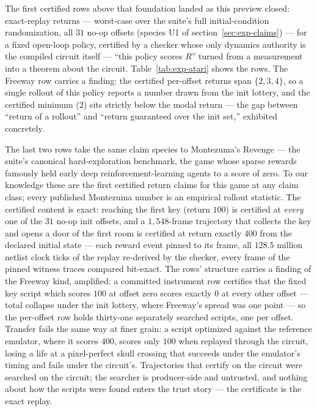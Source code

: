 The first certified rows above that foundation landed as this
preview closed: exact-replay returns --- worst-case over the suite's
full initial-condition randomization, all $31$ no-op offsets (species
U1 of section~\ref{sec:exp-claims}) --- for a fixed open-loop
policy, certified by a checker whose only dynamics
authority is the compiled circuit itself --- ``this policy scores
$R$'' turned from a measurement into a theorem about the circuit.
Table~\ref{tab:exp-atari} shows the rows. The Freeway row carries a
finding: the certified per-offset returns span $\{2,3,4\}$, so a
single rollout of this policy reports a number drawn from the init
lottery, and the certified minimum ($2$) sits strictly below the
modal return --- the gap between ``return of a rollout'' and ``return
guaranteed over the init set,'' exhibited concretely.

The last two rows take the same claim species to Montezuma's Revenge
--- the suite's canonical hard-exploration benchmark, the game whose
sparse rewards famously held early deep reinforcement-learning agents
to a score of zero. To our knowledge these are the first certified
return claims for this game at any claim class; every published
Montezuma number is an empirical rollout statistic. The certified
content is exact: reaching the first key (return $100$) is certified
at \emph{every} one of the $31$ no-op init offsets, and a
$1{,}548$-frame trajectory that collects the key and opens a door of
the first room is certified at return exactly $400$ from the declared
initial state --- each reward event pinned to its frame, all
$128.5$ million netlist clock ticks of the replay re-derived by the
checker, every frame of the pinned witness traces compared bit-exact.
The rows' structure carries a finding of the Freeway kind, amplified:
a committed instrument row certifies that the fixed key script which
scores $100$ at offset zero scores exactly $0$ at every other offset
--- total collapse under the init lottery, where Freeway's spread was
one point --- so the per-offset row holds thirty-one separately
searched scripts, one per offset. Transfer fails the same way at
finer grain: a script optimized against the reference emulator, where
it scores $400$, scores only $100$ when replayed through the circuit,
losing a life at a pixel-perfect skull crossing that succeeds under
the emulator's timing and fails under the circuit's. Trajectories
that certify on the circuit were searched on the circuit; the
searcher is producer-side and untrusted, and nothing about how the
scripts were found enters the trust story --- the certificate is the
exact replay.

